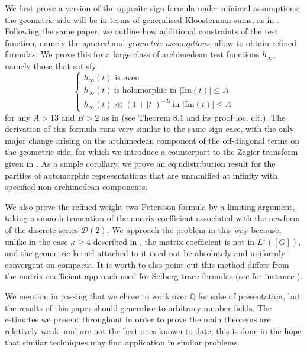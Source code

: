 \documentclass{article}
\numberwithin{equation}{section}
\begin{document}
We first prove a version of the opposite sign formula under minimal assumptions; the geometric side will be in terms of generalised Kloosterman sums, as in \cite{generalised}. Following the same paper, we outline how additional constraints of the test function, namely the \emph{spectral} and \emph{geometric assumptions}, allow to obtain refined formulas. We prove this for a large class of archimedean test functions $h_\infty$, namely those that satisfy
\begin{equation}\label{def:testfunction-conditions}
    \begin{cases}
        h_\infty(t) \text{ is even} \\
        h_\infty(t) \ \text{is holomorphic in } |\text{Im}(t)|\leq A \\
        h_\infty(t)\ll (1+|t|)^{-B} \ \text{in } |\text{Im}(t)|\leq A
    \end{cases}
\end{equation}
for any $A>13$ and $B>2$ as in \cite{KL-kuznetsov} (see Theorem 8.1 and its proof loc. cit.). The derivation of this formula runs very similar to the same sign case, with the only major change arising on the archimedean component of the off-diagonal terms on the geometric side, for which we introduce a counterpart to the Zagier transform given in \cite[\S 7.5.2]{KL-kuznetsov}.  
As a simple corollary, we prove an equidistribution result for the parities of automorphic representations that are unramified at infinity with specified non-archimedean components.


We also prove the refined weight two Petersson formula by a limiting argument, taking a smooth truncation of the matrix coefficient associated with the newform of the discrete series $\mathcal{D}(2)$. We approach the problem in this way because, unlike in the case $\kappa \geq 4$ described in \cite{KL-petersson}, the matrix coefficient is not in $L^1([G])$, and the geometric kernel attached to it need not be absolutely and uniformly convergent on compacta. It is worth to also point out this method differs from the matrix coefficient approach used for Selberg trace formulas (see for instance \cite[Corollary 7.5.4]{palm2012explicitgl2traceformulas}).


We mention in passing that we chose to work over $\mathbb{Q}$ for sake of presentation, but the results of this paper should generalise to arbitrary number fields. The estimates we present throughout in order to prove the main theorems are relatively weak, and are not the best ones known to date; this is done in the hope that similar techniques may find application in similar problems.
 
\end{document}

